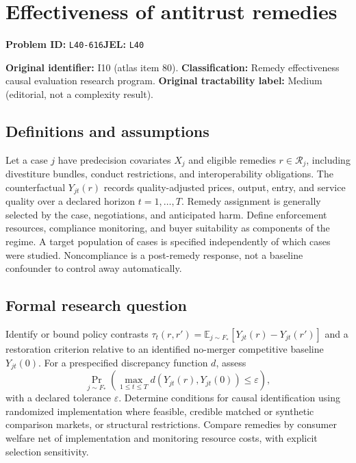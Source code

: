 \documentclass[11pt,a4paper]{article}
\begin{document}
\section*{Effectiveness of antitrust remedies}
\textbf{Problem ID:} \texttt{L40-616}\quad \textbf{JEL:} \texttt{L40}\par
\label{problem:OP-0080}
\label{atlas:prob:I10}

\noindent\textbf{Original identifier:} I10 (atlas item 80). \textbf{Classification:} Remedy effectiveness causal evaluation research program. \textbf{Original tractability label:} Medium (editorial, not a complexity result).

\subsection*{Definitions and assumptions}

Let a case $j$ have predecision covariates $X_j$ and eligible remedies $r\in\mathcal R_j$, including divestiture bundles, conduct restrictions, and interoperability obligations. The counterfactual $Y_{jt}(r)$ records quality-adjusted prices, output, entry, and service quality over a declared horizon $t=1,\ldots,T$. Remedy assignment is generally selected by the case, negotiations, and anticipated harm. Define enforcement resources, compliance monitoring, and buyer suitability as components of the regime. A target population of cases is specified independently of which cases were studied. Noncompliance is a post-remedy response, not a baseline confounder to control away automatically.

\subsection*{Formal research question}

Identify or bound policy contrasts $\tau_t(r,r')=\mathbb E_{j\sim F_*}[Y_{jt}(r)-Y_{jt}(r')]$ and a restoration criterion relative to an identified no-merger competitive baseline $Y_{jt}(0)$. For a prespecified discrepancy function $d$, assess
\[
\Pr_{j\sim F_*}\!\left(\max_{1\leq t\leq T}d(Y_{jt}(r),Y_{jt}(0))\leq\varepsilon\right),
\]
with a declared tolerance $\varepsilon$. Determine conditions for causal identification using randomized implementation where feasible, credible matched or synthetic comparison markets, or structural restrictions. Compare remedies by consumer welfare net of implementation and monitoring resource costs, with explicit selection sensitivity.
\end{document}
